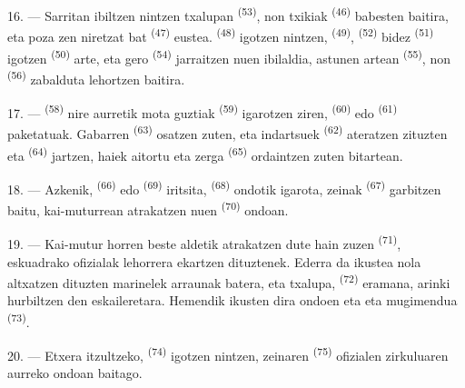 16. --- Sarritan ibiltzen nintzen txalupan 
\textsuperscript{(53)}, non  txikiak \textsuperscript{(46)}
babesten baitira, eta poza zen niretzat  bat
\textsuperscript{(47)} eustea.  \textsuperscript{(48)} igotzen nintzen,
 \textsuperscript{(49)}, 
\textsuperscript{(52)} bidez  \textsuperscript{(51)} igotzen
 \textsuperscript{(50)} arte, eta gero 
\textsuperscript{(54)} jarraitzen nuen ibilaldia, 
astunen artean \textsuperscript{(55)}, non 
\textsuperscript{(56)} zabalduta lehortzen baitira.

17. ---  \textsuperscript{(58)} nire aurretik 
mota guztiak \textsuperscript{(59)} igarotzen ziren, 
\textsuperscript{(60)} edo  \textsuperscript{(61)}
paketatuak. Gabarren  \textsuperscript{(63)} osatzen zuten, eta
 indartsuek \textsuperscript{(62)} ateratzen zituzten eta
 \textsuperscript{(64)} jartzen, 
haiek aitortu eta zerga  \textsuperscript{(65)} ordaintzen zuten
bitartean.

18. --- Azkenik,  \textsuperscript{(66)} edo
 \textsuperscript{(69)} iritsita,  \textsuperscript{(68)}
ondotik igarota, zeinak  \textsuperscript{(67)} garbitzen
baitu, kai-muturrean atrakatzen nuen 
\textsuperscript{(70)} ondoan.

19. --- Kai-mutur horren beste aldetik atrakatzen dute hain zuzen
 \textsuperscript{(71)}, eskuadrako ofizialak lehorrera
ekartzen dituztenek. Ederra da ikustea nola altxatzen dituzten marinelek arraunak
batera, eta txalupa,  \textsuperscript{(72)} eramana, arinki
hurbiltzen den eskaileretara. Hemendik ikusten dira ondoen  eta
 eta  mugimendua
 \textsuperscript{(73)}.

\VUsaut{3.0mm}
\VUsaut{3.0mm}

20. --- Etxera itzultzeko,  \textsuperscript{(74)}
igotzen nintzen, zeinaren  \textsuperscript{(75)} ofizialen
zirkuluaren aurreko  ondoan baitago.

